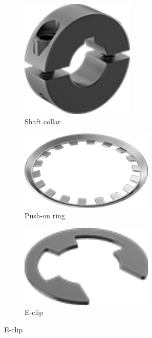 \documentclass[10pt,letterpaper]{book}
\begin{document}
	\begin{figure}[H]
		\centering
		\begin{subfigure}[b]{.24\linewidth}
			\includegraphics[width=0.6\textwidth]{imgs/shaftcollar.png}
			\caption{Shaft collar}
		\end{subfigure}
		\begin{subfigure}[b]{.24\linewidth}
			\includegraphics[width=0.7\textwidth]{imgs/pushonring.png}
			\caption{Push-on ring}
		\end{subfigure}
		\begin{subfigure}[b]{.24\linewidth}
			\includegraphics[width=0.7\textwidth]{imgs/eclip.png}
			\caption{E-clip}

\end{subfigure}
\end{figure}
\end{document}
